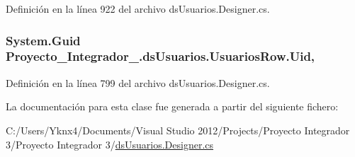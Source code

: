 Definición en la línea 922 del archivo ds\-Usuarios.\-Designer.\-cs.

\hypertarget{class_proyecto___integrador__3_1_1ds_usuarios_1_1_usuarios_row_a52527439e50952886c2ec1ddc5e06f3d}{
\subsubsection[{Uid}]{\setlength{\rightskip}{0pt plus 5cm}System.\-Guid Proyecto\-\_\-\-Integrador\-\_.\-ds\-Usuarios.\-Usuarios\-Row.\-Uid\hspace{0.3cm}{\ttfamily [get]}, {\ttfamily [set]}}}\label{class_proyecto___integrador__3_1_1ds_usuarios_1_1_usuarios_row_a52527439e50952886c2ec1ddc5e06f3d}


Definición en la línea 799 del archivo ds\-Usuarios.\-Designer.\-cs.



La documentación para esta clase fue generada a partir del siguiente fichero\-:\begin{DoxyCompactItemize}
\item 
C\-:/\-Users/\-Yknx4/\-Documents/\-Visual Studio 2012/\-Projects/\-Proyecto Integrador 3/\-Proyecto Integrador 3/\hyperlink{ds_usuarios_8_designer_8cs}{ds\-Usuarios.\-Designer.\-cs}\end{DoxyCompactItemize}

